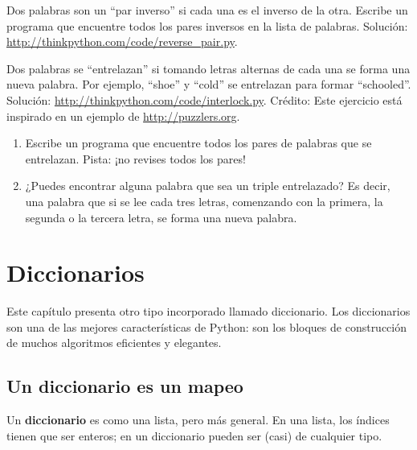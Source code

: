 \documentclass[10pt]{book}
\begin{document}
\begin{exercise}

Dos palabras son un ``par inverso'' si cada una es el inverso de la
otra.  Escribe un programa que encuentre todos los pares inversos en la
lista de palabras.  Solución: \url{http://thinkpython.com/code/reverse_pair.py}.

\end{exercise}

\begin{exercise}

Dos palabras se ``entrelazan'' si tomando letras alternas de cada una se forma
una nueva palabra.  Por ejemplo, ``shoe'' y ``cold''
se entrelazan para formar ``schooled''.
Solución: \url{http://thinkpython.com/code/interlock.py}.
Crédito: Este ejercicio está inspirado en un ejemplo de \url{http://puzzlers.org}.

\begin{enumerate}

\item Escribe un programa que encuentre todos los pares de palabras que se entrelazan.
  Pista: ¡no revises todos los pares!

\item ¿Puedes encontrar alguna palabra que sea un triple entrelazado? Es decir,
  una palabra que si se lee cada tres letras, comenzando con la primera, la segunda o
  la tercera letra, se forma una nueva palabra.

\end{enumerate}
\end{exercise}


\chapter{Diccionarios}

Este capítulo presenta otro tipo incorporado llamado diccionario.
Los diccionarios son una de las mejores características de Python: son los
bloques de construcción de muchos algoritmos eficientes y elegantes.


\section{Un diccionario es un mapeo}

Un {\bf diccionario} es como una lista, pero más general.  En una lista,
los índices tienen que ser enteros; en un diccionario pueden ser
(casi) de cualquier tipo.
\end{document}
